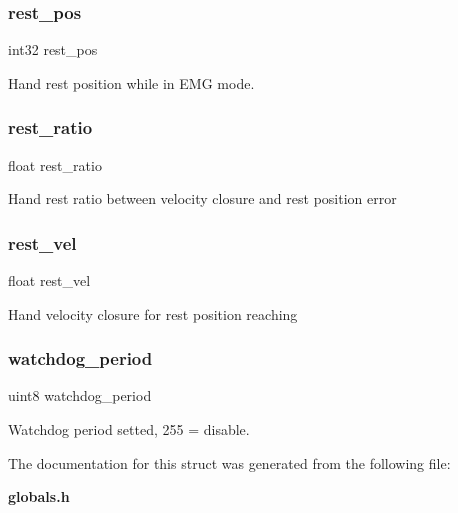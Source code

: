 \subsubsection{rest\+\_\+pos}
{\footnotesize\ttfamily int32 rest\+\_\+pos}

Hand rest position while in E\+MG mode. \mbox{\label{structst__mem_a36ce85c7c822c5a1c014aed67f47f5e7}} 
\subsubsection{rest\+\_\+ratio}
{\footnotesize\ttfamily float rest\+\_\+ratio}

Hand rest ratio between velocity closure and rest position error \mbox{\label{structst__mem_ac1ad7e4ba4a8bd648b4f8d9ee6105e3c}} 
\subsubsection{rest\+\_\+vel}
{\footnotesize\ttfamily float rest\+\_\+vel}

Hand velocity closure for rest position reaching \mbox{\label{structst__mem_a1aae70aad54a04c7b41a8d2dcd7aba14}} 
\subsubsection{watchdog\+\_\+period}
{\footnotesize\ttfamily uint8 watchdog\+\_\+period}

Watchdog period setted, 255 = disable. 

The documentation for this struct was generated from the following file\+:\begin{DoxyCompactItemize}
\item 
\textbf{ globals.\+h}\end{DoxyCompactItemize}
